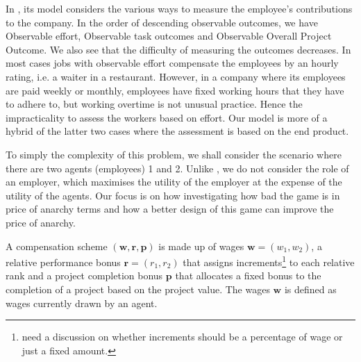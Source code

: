 \documentclass[10pt, a4paper]{article}
\begin{document}
	In \cite{Chakravarti2015}, its model considers the various ways to measure the employee's contributions to the company. In the order of descending observable outcomes, we have Observable effort, Observable task outcomes and Observable Overall Project Outcome. We also see that the difficulty of measuring the outcomes decreases. In most cases jobs with observable effort compensate the employees by an hourly rating, i.e. a waiter in a restaurant. However, in a company where its employees are paid weekly or monthly, employees have fixed working hours that they have to adhere to, but working overtime is not unusual practice. Hence the impracticality to assess the workers based on effort. Our model is more of a hybrid of the latter two cases where the assessment is based on the end product.
	
	
	 To simply the complexity of this problem, we shall consider the scenario where there are two agents (employees) 1 and 2. Unlike \cite{Chakravarti2015}, we do not consider the role of an employer, which maximises the utility of the employer at the expense of the utility of the agents. Our focus is on how investigating how bad the game is in price of anarchy terms and how a better design of this game can improve the price of anarchy.
	
	
	
	A compensation scheme $(\mathbf{w}, \mathbf{r}, \mathbf{p})$ is made up of wages $\mathbf{w}=(w_1,w_2)$, a relative performance bonus $\mathbf{r}=(r_1,r_2)$ that assigns increments\footnote{need a discussion on whether increments should be a percentage of wage or just a fixed amount.} to each relative rank and a project completion bonus $\mathbf{p}$ that allocates a fixed bonus to the completion of a project based on the project value. The wages $\mathbf{w}$ is defined as wages currently drawn by an agent. 
	
	
%	
%	
%	
%	
%	
%	
	
	
\end{document}
